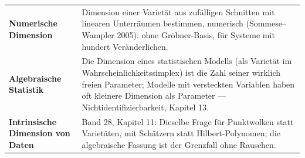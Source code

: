 \begin{forschung}
\begin{center}
{\small
\renewcommand{\arraystretch}{1.45}
\begin{tabular}{@{}P{3.0cm}P{5.2cm}@{}}
\toprule
\textbf{Numerische Dimension} & Dimension einer Varietät aus zufälligen Schnitten mit linearen Unterräumen bestimmen, numerisch (Sommese--Wampler 2005): ohne Gröbner-Basis, für Systeme mit hundert Veränderlichen.\\
\textbf{Algebraische Statistik} & Die Dimension eines statistischen Modells (als Varietät im Wahrscheinlichkeitssimplex) ist die Zahl seiner wirklich freien Parameter; Modelle mit versteckten Variablen haben oft kleinere Dimension als Parameter --- Nichtidentifizierbarkeit, Kapitel 13.\\
\textbf{Intrinsische Dimension von Daten} & Band 28, Kapitel 11: Dieselbe Frage für Punktwolken statt Varietäten, mit Schätzern statt Hilbert-Polynomen; die algebraische Fassung ist der Grenzfall ohne Rauschen.\\
\bottomrule
\end{tabular}}
\end{center}

\begin{center}
\begin{minipage}{0.88\textwidth}
\end{minipage}
\end{center}
\end{forschung}

